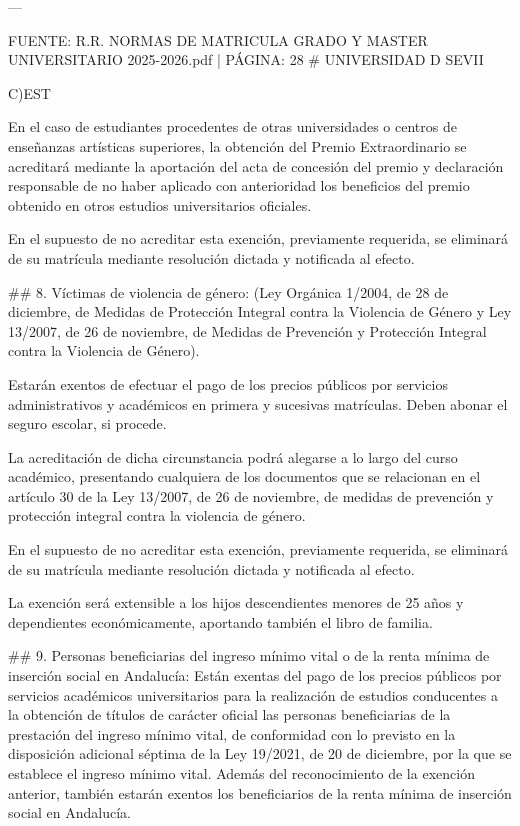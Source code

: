 \documentclass{article}
\begin{document}
\begin{itemize}
\begin{itemize}
\begin{scriptsize}
                  ---

                  FUENTE: R.R. NORMAS DE MATRICULA GRADO Y MASTER UNIVERSITARIO 2025-2026.pdf | PÁGINA: 28
                  \# UNIVERSIDAD D SEVII

                  C)EST

                  En el caso de estudiantes procedentes de otras universidades o centros de enseñanzas artísticas superiores, la obtención del Premio Extraordinario se acreditará mediante la aportación del acta de concesión del premio y declaración responsable de no haber aplicado con anterioridad los beneficios del premio obtenido en otros estudios universitarios oficiales.

                  En el supuesto de no acreditar esta exención, previamente requerida, se eliminará de su matrícula mediante resolución dictada y notificada al efecto.

                  \#\# 8. Víctimas de violencia de género:
                  (Ley Orgánica 1/2004, de 28 de diciembre, de Medidas de Protección Integral contra la Violencia de Género y Ley 13/2007, de 26 de noviembre, de Medidas de Prevención y Protección Integral contra la Violencia de Género).

                  Estarán exentos de efectuar el pago de los precios públicos por servicios administrativos y académicos en primera y sucesivas matrículas. Deben abonar el seguro escolar, si procede.

                  La acreditación de dicha circunstancia podrá alegarse a lo largo del curso académico, presentando cualquiera de los documentos que se relacionan en el artículo 30 de la Ley 13/2007, de 26 de noviembre, de medidas de prevención y protección integral contra la violencia de género.

                  En el supuesto de no acreditar esta exención, previamente requerida, se eliminará de su matrícula mediante resolución dictada y notificada al efecto.

                  La exención será extensible a los hijos descendientes menores de 25 años y dependientes económicamente, aportando también el libro de familia.

                  \#\# 9. Personas beneficiarias del ingreso mínimo vital o de la renta mínima de inserción social en Andalucía:
                  Están exentas del pago de los precios públicos por servicios académicos universitarios para la realización de estudios conducentes a la obtención de títulos de carácter oficial las personas beneficiarias de la prestación del ingreso mínimo vital, de conformidad con lo previsto en la disposición adicional séptima de la Ley 19/2021, de 20 de diciembre, por la que se establece el ingreso mínimo vital. Además del reconocimiento de la exención anterior, también estarán exentos los beneficiarios de la renta mínima de inserción social en Andalucía.


\end{scriptsize}
\end{itemize}
\end{itemize}
\end{document}
